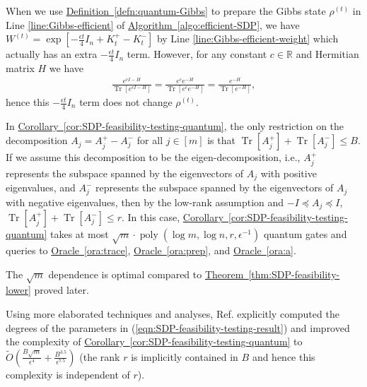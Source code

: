 \documentclass[a4paper,UKenglish,cleveref, autoref]{lipics-v2019}
\theoremstyle{remark}
\numberwithin{equation}{section}
\numberwithin{oracle}{section}
\numberwithin{remark}{section}
\newcommand{\eqn}[1]{(\ref{eqn:#1})}
\newcommand{\ora}[1]{\hyperref[ora:#1]{Oracle~\ref*{ora:#1}}}
\newcommand{\thm}[1]{\hyperref[thm:#1]{Theorem~\ref*{thm:#1}}}
\newcommand{\cor}[1]{\hyperref[cor:#1]{Corollary~\ref*{cor:#1}}}
\newcommand{\defn}[1]{\hyperref[defn:#1]{Definition~\ref*{defn:#1}}}
\newcommand{\algo}[1]{\hyperref[algo:#1]{Algorithm~\ref*{algo:#1}}}
\newcommand{\range}[1]{[#1]}
\newcommand{\R}{\ensuremath{\mathbb{R}}}
\DeclareMathOperator{\poly}{poly}
\DeclareMathOperator{\Tr}{Tr}
\begin{document}
\begin{remark}
When we use \defn{quantum-Gibbs} to prepare the Gibbs state $\rho^{(t)}$ in Line \ref{line:Gibbs-efficient} of \algo{efficient-SDP}, we have $W^{(t)}=\exp[-\frac{\epsilon t}{4}I_{n}+K_{t}^{+}-K_{t}^{-}]$ by Line \ref{line:Gibbs-efficient-weight} which actually has an extra $-\frac{\epsilon t}{4}I_{n}$ term. However, for any constant $c\in\R$ and Hermitian matrix $H$ we have
\begin{align}
\frac{e^{cI-H}}{\Tr[e^{cI-H}]}=\frac{e^{c}e^{-H}}{\Tr[e^{c}e^{-H}]}=\frac{e^{-H}}{\Tr[e^{-H}]},
\end{align}
hence this $-\frac{\epsilon t}{4}I_{n}$ term does not change $\rho^{(t)}$.
\end{remark}

\begin{remark}
In \cor{SDP-feasibility-testing-quantum}, the only restriction on the decomposition $A_{j}=A_{j}^{+}-A_{j}^{-}$ for all $j\in\range{m}$ is that $\Tr[A_{j}^{+}]+\Tr[A_{j}^{-}]\leq B$. If we assume this decomposition to be the eigen-decomposition, i.e., $A_{j}^{+}$ represents the subspace spanned by the eigenvectors of $A_{j}$ with positive eigenvalues, and $A_{j}^{-}$ represents the subspace spanned by the eigenvectors of $A_{j}$ with negative eigenvalues, then by the low-rank assumption and $-I\preceq A_{j}\preceq I$, $\Tr[A_{j}^{+}]+\Tr[A_{j}^{-}]\leq r$. In this case, \cor{SDP-feasibility-testing-quantum} takes at most $\sqrt{m}\cdot\poly(\log m,\log n,r,\epsilon^{-1})$ quantum gates and queries to \ora{trace}, \ora{prep}, and \ora{a}.
\end{remark}

\begin{remark}
The $\sqrt{m}$ dependence is optimal compared to \thm{SDP-feasibility-lower} proved later.
\end{remark}

\begin{remark}
Using more elaborated techniques and analyses, Ref. \cite{vAG18} explicitly computed the degrees of the parameters in \eqn{SDP-feasibility-testing-result} and improved the complexity of \cor{SDP-feasibility-testing-quantum} to $\tilde{O}(\frac{B\sqrt{m}}{\epsilon^{4}}+\frac{B^{3.5}}{\epsilon^{7.5}})$ (the rank $r$ is implicitly contained in $B$ and hence this complexity is independent of $r$).
\end{remark}

\end{document}
